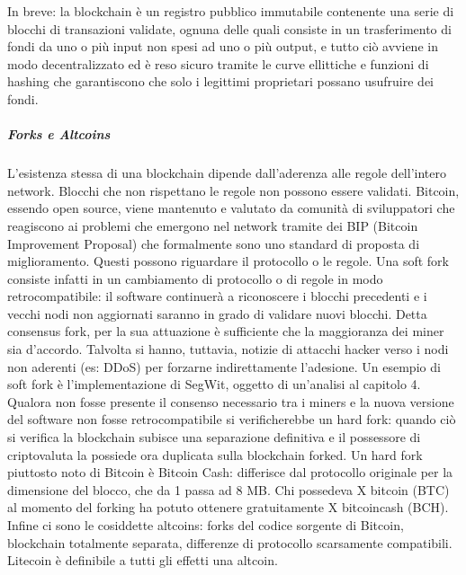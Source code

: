 In breve: la blockchain è un registro pubblico immutabile contenente una serie di blocchi di transazioni validate, ognuna delle quali consiste in un trasferimento di fondi da uno o più input non spesi ad uno o più output, e tutto ciò avviene in modo decentralizzato ed è reso sicuro tramite le curve ellittiche e funzioni di hashing che garantiscono che solo i legittimi proprietari possano usufruire dei fondi.







\subparagraph{Forks e Altcoins}

L’esistenza stessa di una blockchain dipende dall’aderenza alle regole dell’intero network. Blocchi che non rispettano le regole non possono essere validati.
Bitcoin, essendo open source, viene mantenuto e valutato da comunità di sviluppatori che reagiscono ai problemi che emergono nel network tramite dei BIP (Bitcoin Improvement Proposal) che formalmente sono uno standard di proposta di miglioramento. Questi possono riguardare il protocollo o le regole. Una soft fork consiste infatti in un cambiamento di protocollo o di regole in modo retrocompatibile: il software continuerà a riconoscere i blocchi precedenti e i vecchi nodi non aggiornati saranno in grado di validare nuovi blocchi. Detta consensus fork, per la sua attuazione è sufficiente che la maggioranza dei miner sia d’accordo. Talvolta si hanno, tuttavia, notizie di attacchi hacker verso i nodi non aderenti (es: DDoS) per forzarne indirettamente l’adesione. Un esempio di soft fork è l’implementazione di SegWit, oggetto di un’analisi al capitolo 4.
Qualora non fosse presente il consenso necessario tra i miners e la nuova versione del software non fosse retrocompatibile si verificherebbe un hard fork: quando ciò si verifica la blockchain subisce una separazione definitiva e il possessore di criptovaluta la possiede ora duplicata sulla blockchain forked.
Un hard fork piuttosto noto di Bitcoin è Bitcoin Cash: differisce dal protocollo originale per la dimensione del blocco, che da 1 passa ad 8 MB. Chi possedeva X bitcoin (BTC) al momento del forking ha potuto ottenere gratuitamente X bitcoincash (BCH).
Infine ci sono le cosiddette altcoins: forks del codice sorgente di Bitcoin, blockchain totalmente separata, differenze di protocollo scarsamente compatibili. Litecoin è definibile a tutti gli effetti una altcoin.





